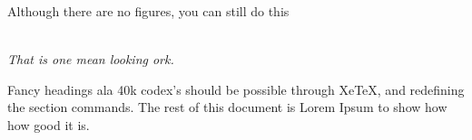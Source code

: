 \documentclass{article}
\begin{document}
\begin{multicols}{3}
Although there are no figures, you can still do this
\begin{minipage}[c]{1.0\linewidth}
  \vspace{1em}
  \centering
  \\
  \it That is one mean looking ork.
  \vspace{1em}
\end{minipage}

Fancy headings ala 40k codex's should be possible through XeTeX, and redefining the section commands. The rest of this document is Lorem Ipsum to show how how good it is.
\blinddocument

\end{multicols}
\end{document}
